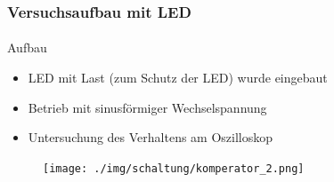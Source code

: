 \begin{frame}
\frametitle{Versuchsaufbau mit LED}
\framesubtitle{}
    \begin{block}{Aufbau}
         \begin{itemize}
             \item LED mit Last (zum Schutz der LED) wurde eingebaut
             \item Betrieb mit sinusförmiger Wechselspannung
             \item Untersuchung des Verhaltens am Oszilloskop
         \end{itemize}
    \end{block}
    \begin{figure}[H]
    \begin{center}
            \texttt{[image: ./img/schaltung/komperator\_2.png]}
    \end{center}
    \end{figure}
\end{frame}
